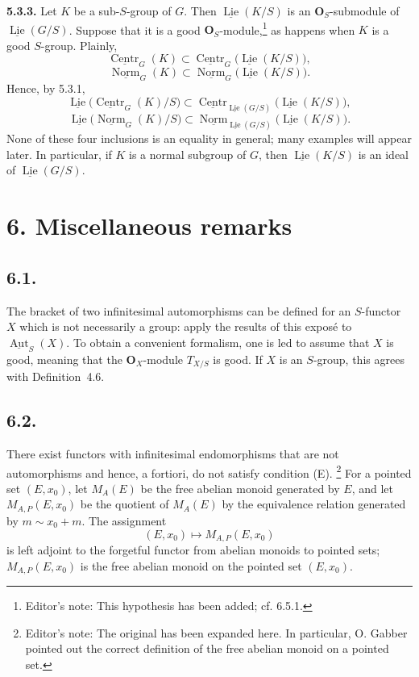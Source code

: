 \medskip
\noindent\textbf{5.3.3.}
Let \(K\) be a sub-\(S\)-group of \(G\). Then
\(\underline{\operatorname{Lie}}(K/S)\) is an
\(\mathbf O_S\)-submodule of
\(\underline{\operatorname{Lie}}(G/S)\). Suppose that it is a good
\(\mathbf O_S\)-module,\footnote{Editor's note: This hypothesis has
been added; cf. 6.5.1.} as happens when \(K\) is a good \(S\)-group.
Plainly,
\[
 \underline{\operatorname{Centr}}_G(K)
 \subset
 \underline{\operatorname{Centr}}_G
   \bigl(\underline{\operatorname{Lie}}(K/S)\bigr),
\]
\[
 \underline{\operatorname{Norm}}_G(K)
 \subset
 \underline{\operatorname{Norm}}_G
   \bigl(\underline{\operatorname{Lie}}(K/S)\bigr).
\]
Hence, by 5.3.1,
\[
 \underline{\operatorname{Lie}}
   \bigl(\underline{\operatorname{Centr}}_G(K)/S\bigr)
 \subset
 \underline{\operatorname{Centr}}_
   {\underline{\operatorname{Lie}}(G/S)}
   \bigl(\underline{\operatorname{Lie}}(K/S)\bigr),
\]
\[
 \underline{\operatorname{Lie}}
   \bigl(\underline{\operatorname{Norm}}_G(K)/S\bigr)
 \subset
 \underline{\operatorname{Norm}}_
   {\underline{\operatorname{Lie}}(G/S)}
   \bigl(\underline{\operatorname{Lie}}(K/S)\bigr).
\]
None of these four inclusions is an equality in general; many examples
will appear later. In particular, if \(K\) is a normal subgroup of
\(G\), then \(\underline{\operatorname{Lie}}(K/S)\) is an ideal of
\(\underline{\operatorname{Lie}}(G/S)\).

\section*{6. Miscellaneous remarks}

\subsection*{6.1.}
The bracket of two infinitesimal automorphisms can be defined for an
\(S\)-functor \(X\) which is not necessarily a group: apply the
results of this expos\'e to \(\underline{\operatorname{Aut}}_S(X)\).
To obtain a convenient formalism, one is led to assume that \(X\) is
good, meaning that the \(\mathbf O_X\)-module \(T_{X/S}\) is good. If
\(X\) is an \(S\)-group, this agrees with Definition~4.6.

\subsection*{6.2.}
There exist functors with infinitesimal endomorphisms that are not
automorphisms and hence, a fortiori, do not satisfy condition (E).
\footnote{Editor's note: The original has been expanded here. In
particular, O. Gabber pointed out the correct definition of the free
abelian monoid on a pointed set.}
For a pointed set \((E,x_0)\), let \(M_A(E)\) be the free abelian
monoid generated by \(E\), and let \(M_{A,P}(E,x_0)\) be the quotient
of \(M_A(E)\) by the equivalence relation generated by
\(m\sim x_0+m\). The assignment
\[
 (E,x_0)\longmapsto M_{A,P}(E,x_0)
\]
is left adjoint to the forgetful functor from abelian monoids to
pointed sets; \(M_{A,P}(E,x_0)\) is the free abelian monoid on the
pointed set \((E,x_0)\).

